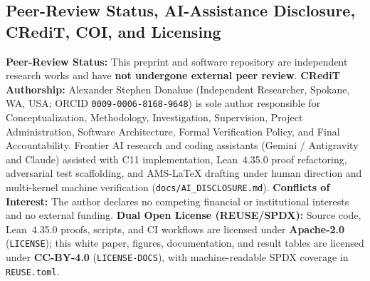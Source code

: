 \documentclass[11pt,reqno]{amsart}
\theoremstyle{plain}
\theoremstyle{definition}
\theoremstyle{remark}
\newcommand{\code}[1]{{\footnotesize\nolinkurl{#1}}}
\begin{document}
\subsection{Peer-Review Status, AI-Assistance Disclosure, CRediT, COI, and Licensing}
\textbf{Peer-Review Status:} This preprint and software repository are independent research works and have \textbf{not undergone external peer review}.
\textbf{CRediT Authorship:} Alexander Stephen Donahue (Independent Researcher, Spokane, WA, USA; ORCID \code{0009-0006-8168-9648}) is sole author responsible for Conceptualization, Methodology, Investigation, Supervision, Project Administration, Software Architecture, Formal Verification Policy, and Final Accountability. Frontier AI research and coding assistants (Gemini / Antigravity and Claude) assisted with C11 implementation, Lean~4.35.0 proof refactoring, adversarial test scaffolding, and AMS-LaTeX drafting under human direction and multi-kernel machine verification (\code{docs/AI_DISCLOSURE.md}).
\textbf{Conflicts of Interest:} The author declares no competing financial or institutional interests and no external funding.
\textbf{Dual Open License (REUSE/SPDX):} Source code, Lean~4.35.0 proofs, scripts, and CI workflows are licensed under \textbf{Apache-2.0} (\code{LICENSE}); this white paper, figures, documentation, and result tables are licensed under \textbf{CC-BY-4.0} (\code{LICENSE-DOCS}), with machine-readable SPDX coverage in \code{REUSE.toml}.

\FloatBarrier


\end{document}
